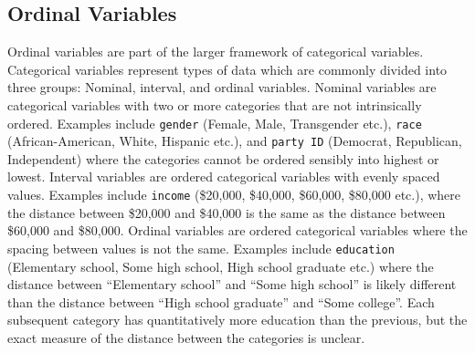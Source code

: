 \documentclass[12pt,econ]{sources/authesis}
\begin{document}
\hypertarget{ordblock-theory-ordinal}{%
\subsection{Ordinal Variables}\label{ordblock-theory-ordinal}}

Ordinal variables are part of the larger framework of categorical variables. Categorical variables represent types of data which are commonly divided into three groups: Nominal, interval, and ordinal variables. Nominal variables are categorical variables with two or more categories that are not intrinsically ordered. Examples include \texttt{gender} (Female, Male, Transgender etc.), \texttt{race} (African-American, White, Hispanic etc.), and \texttt{party\ ID} (Democrat, Republican, Independent) where the categories cannot be ordered sensibly into highest or lowest. Interval variables are ordered categorical variables with evenly spaced values. Examples include \texttt{income} (\$20,000, \$40,000, \$60,000, \$80,000 etc.), where the distance between \$20,000 and \$40,000 is the same as the distance between \$60,000 and \$80,000. Ordinal variables are ordered categorical variables where the spacing between values is not the same. Examples include \texttt{education} (Elementary school, Some high school, High school graduate etc.) where the distance between ``Elementary school'' and ``Some high school'' is likely different than the distance between ``High school graduate'' and ``Some college''. Each subsequent category has quantitatively more education than the previous, but the exact measure of the distance between the categories is unclear.
\end{document}
